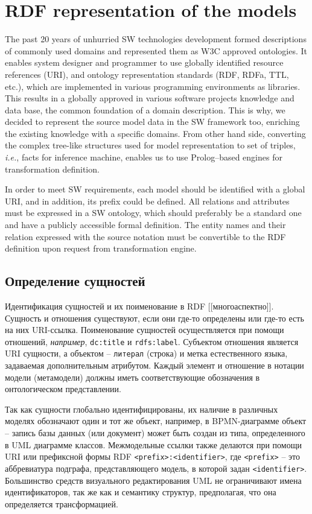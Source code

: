 \documentclass[conference]{IEEEtran} \IEEEoverridecommandlockouts
\begin{document}
\section{RDF representation of the models} \label{sec:rdf-repr} 

The past 20 years of unhurried SW technologies development formed descriptions of commonly used domains and represented them as W3C approved ontologies. It enables system designer and programmer to use globally identified resource references (URI), and ontology representation standards (RDF, RDFa, TTL, etc.), which are implemented in various programming environments as libraries. This results in a globally approved in various software projects knowledge and data base, the common foundation of a domain description. This is why, we decided to represent the source model data in the SW framework too, enriching the existing knowledge with a specific domains. From other hand side, converting the complex tree-like structures used for model representation to set of triples, \emph{i.e.}, facts for inference machine, enables us to use Prolog--based engines for transformation definition. 

In order to meet SW requirements, each model should be identified with a global URI, and in addition, its prefix could be defined. All relations and attributes must be expressed in a SW ontology, which should preferably be a standard one and have a publicly accessible formal definition. The entity names and their relation expressed with the source notation must be convertible to the RDF definition upon request from transformation engine. 

\subsection{Определение сущностей} \label{sec:ent-def} 

Идентификация сущностей и их поименование в RDF [[многоаспектно]]. Сущность и отношения существуют, если они где-то определены или где-то есть на них URI-ссылка. Поименование сущностей осуществляется при помощи отношений, \emph{например}, \texttt{dc:title} и \texttt{rdfs:label}. Субъектом отношения является URI сущности, а объектом -- \texttt{литерал} (строка) и метка естественного языка, задаваемая дополнительным атрибутом. Каждый элемент и отношение в нотации модели (метамодели) должны иметь соответствующие обозначения в онтологическом представлении. 

Так как сущности глобально идентифицированы, их наличие в различных моделях обозначают один и тот же объект, например, в BPMN-диаграмме объект -- запись базы данных (или документ) может быть создан из типа, определенного в UML диаграмме классов. Межмодельные ссылки также делаются при помощи URI или префиксной формы RDF \texttt{<prefix>:<identifier>}, где \texttt{<prefix>} -- это аббревиатура подграфа, представляющего модель, в которой задан \texttt{<identifier>}. Большинство средств визуального редактирования UML не ограничивают имена идентификаторов, так же как и семантику структур, предполагая, что она определяется трансформацией. 
\end{document}
